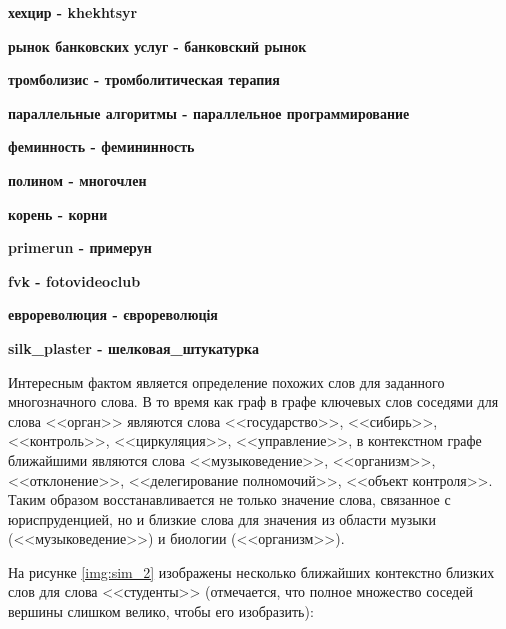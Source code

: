 \textbf{хехцир   -   khekhtsyr}

\textbf{рынок банковских услуг   -   банковский рынок}

\textbf{тромболизис   -   тромболитическая терапия}

\textbf{параллельные алгоритмы   -   параллельное программирование}

\textbf{феминность   -   фемининность}

\textbf{полином  -  многочлен}

\textbf{корень  -   корни}

\textbf{primerun  -  примерун}

\textbf{fvk  -  fotovideoclub}

\textbf{еврореволюция  -   єврореволюція}

\textbf{silk\_plaster    -  шелковая\_штукатурка}

Интересным фактом является определение похожих слов для заданного многозначного слова. В то время как граф в графе ключевых слов соседями для слова <<орган>> являются слова <<государство>>, <<сибирь>>, <<контроль>>, <<циркуляция>>, <<управление>>, в контекстном графе ближайшими являются слова <<музыковедение>>, <<организм>>, <<отклонение>>, <<делегирование полномочий>>, <<объект контроля>>. Таким образом восстанавливается не только значение слова, связанное с юриспруденцией, но и близкие слова для значения из области музыки (<<музыковедение>>) и биологии (<<организм>>).

На рисунке \ref{img:sim_2} изображены несколько ближайших контекстно близких слов для слова <<студенты>> (отмечается, что полное множество соседей вершины слишком велико, чтобы его изобразить):


